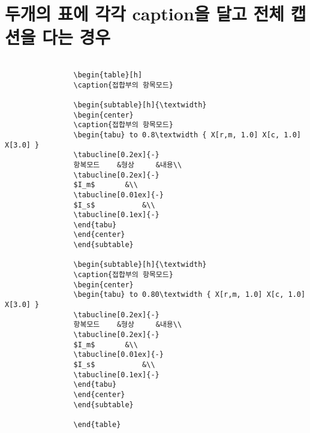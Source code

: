 \documentclass[12pt,a4paper]{report}
\begin{document}
	\section{두개의 표에 각각 caption을 달고 전체 캡션을 다는 경우}

			
		\begin{verbatim}
		
				\begin{table}[h]
				\caption{접합부의 항목모드}
		
				\begin{subtable}[h]{\textwidth}
				\begin{center}
				\caption{접합부의 항목모드}
				\begin{tabu} to 0.8\textwidth { X[r,m, 1.0] X[c, 1.0] X[3.0] }
				\tabucline[0.2ex]{-}		
				항복모드	&형상		&내용\\
				\tabucline[0.2ex]{-}		
				$I_m$		&\\
				\tabucline[0.01ex]{-}		
				$I_s$			&\\
				\tabucline[0.1ex]{-}		
				\end{tabu}
				\end{center}
				\end{subtable}
		
				\begin{subtable}[h]{\textwidth}
				\caption{접합부의 항목모드}
				\begin{center}
				\begin{tabu} to 0.80\textwidth { X[r,m, 1.0] X[c, 1.0] X[3.0] }
				\tabucline[0.2ex]{-}		
				항복모드	&형상		&내용\\
				\tabucline[0.2ex]{-}		
				$I_m$		&\\
				\tabucline[0.01ex]{-}		
				$I_s$			&\\
				\tabucline[0.1ex]{-}		
				\end{tabu}
				\end{center}
				\end{subtable}
		
				\end{table}
		\end{verbatim}
\end{document}
